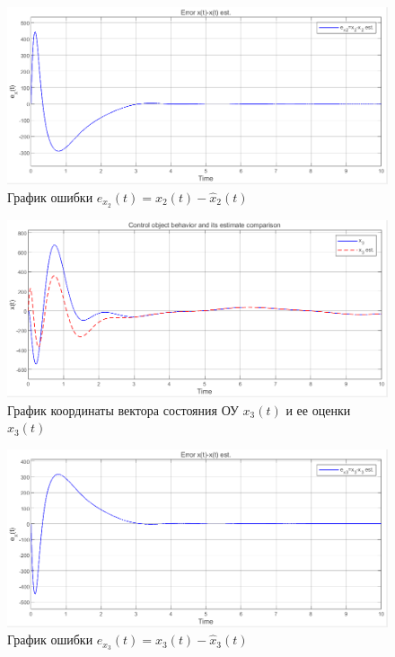 \documentclass[a4paper, 12pt]{article}
\begin{document}
    \begin{figure}[H]
        \centering
        \includegraphics[scale=0.6]{2task_ex2.png}
        \captionsetup{skip=0pt}
        \caption{График ошибки $e_{x_2}(t)=x_{2}(t)-\hat{x}_{2}(t)$}
        \label{fig:2task_ex2}
    \end{figure}
    \begin{figure}[H]
        \centering
        \includegraphics[scale=0.6]{2task_xhx3.png}
        \captionsetup{skip=0pt}
        \caption{График координаты вектора состояния ОУ $x_{3}(t)$ и ее оценки $\hat{x}_{3}(t)$}
        \label{fig:2task_xhx3}
    \end{figure}
    \begin{figure}[H]
        \centering
        \includegraphics[scale=0.6]{2task_ex3.png}
        \captionsetup{skip=0pt}
        \caption{График ошибки $e_{x_3}(t)=x_{3}(t)-\hat{x}_{3}(t)$}
        \label{fig:2task_ex3}
    \end{figure}
\end{document}
